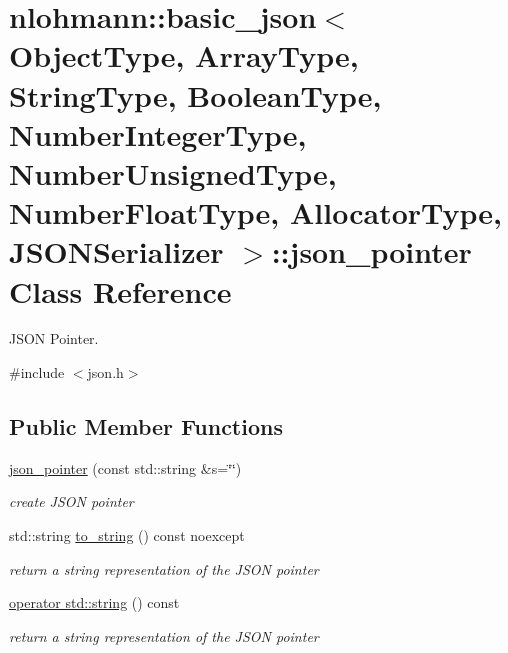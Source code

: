 \hypertarget{classnlohmann_1_1basic__json_1_1json__pointer}{}\section{nlohmann\+:\+:basic\+\_\+json$<$ Object\+Type, Array\+Type, String\+Type, Boolean\+Type, Number\+Integer\+Type, Number\+Unsigned\+Type, Number\+Float\+Type, Allocator\+Type, J\+S\+O\+N\+Serializer $>$\+:\+:json\+\_\+pointer Class Reference}
\label{classnlohmann_1_1basic__json_1_1json__pointer}


J\+S\+ON Pointer.  




{\ttfamily \#include $<$json.\+h$>$}

\subsection*{Public Member Functions}
\begin{DoxyCompactItemize}
\item 
\hyperlink{classnlohmann_1_1basic__json_1_1json__pointer_abaa66b0d30811b8a8670a673c686b75a}{json\+\_\+pointer} (const std\+::string \&s=\char`\"{}\char`\"{})
\begin{DoxyCompactList}\small\item\em create J\+S\+ON pointer \end{DoxyCompactList}\item 
std\+::string \hyperlink{classnlohmann_1_1basic__json_1_1json__pointer_adf63cdde9493796d8aa61bd948984b6d}{to\+\_\+string} () const noexcept
\begin{DoxyCompactList}\small\item\em return a string representation of the J\+S\+ON pointer \end{DoxyCompactList}\item 
\hyperlink{classnlohmann_1_1basic__json_1_1json__pointer_aa2583b66886218c1a035e3e507a5f931}{operator std\+::string} () const
\begin{DoxyCompactList}\small\item\em return a string representation of the J\+S\+ON pointer \end{DoxyCompactList}\end{DoxyCompactItemize}
